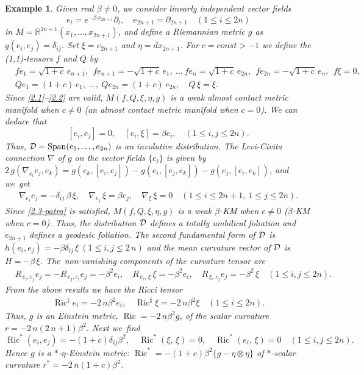 \documentclass[11pt,a4paper,twoside]{article}
\newtheorem{example}{Example}%
\def\Ric{\operatorname{Ric}}
\begin{document}
{\begin{example}\label{Ex-ast-RS}\rm
Given real $\beta\ne0$, we consider linearly independent vector fields
\[
 e_i = e^{-\beta\,x_{2n+1}}\partial_i,\quad e_{2n+1} = \partial_{2n+1}\quad (1\le i\le 2n)
\]
in $M=\mathbb{R}^{2n+1}(x_1,\ldots,x_{2n+1})$, and define a Riemannian metric $g$ as $g(e_i,e_j)=\delta_{ij}$.
Set $\xi=e_{2n+1}$ and $\eta=dx_{2n+1}$. For $c=const>-1$ we define the (1,1)-tensors $f$ and $Q$ by
\begin{align*}
& f e_1 = \sqrt{1+c}\,e_{n+1},\ \
  f e_{n+1} = -\sqrt{1+c}\,e_1,\
   \ldots\
  f e_n =\sqrt{1+c}\,e_{2n},\ \
  f e_{2n} = -\sqrt{1+c}\,e_n,\ \
  f \xi =    0, \\
& Q e_1 = (1+c)\,e_1,\
  \ldots, \
  Q e_{2n} = (1+c)\,e_{2n},\quad
  Q\,\xi = \xi.
\end{align*}
Since \eqref{2.1}--\eqref{2.2} are valid, $M(f,Q,\xi,\eta,g)$ is a weak almost contact metric manifold when $c\ne0$ (an almost contact metric manifold when $c=0$). We can deduce that
\[
 [e_i,e_j]=0,\quad [e_i, \xi] = \beta e_i,\quad (1\le i,j\le 2n).
\]
Thus, ${\cal D}={\rm Span}(e_1,\ldots,e_{2n})$ is an involutive distribution.
The Levi-Civita connection $\nabla$ of $g$ on the vector fields $\{e_i\}$ is given by
$2\,g(\nabla_{e_i}e_j, e_k)= g(e_k,[e_i,e_j])-g(e_i,[e_j,e_k])-g(e_j,[e_i,e_k])$, and we~get
\begin{align*}
 \nabla_{e_i}e_j = -\delta_{ij}\,\beta\,\xi,\quad
 \nabla_{e_j}\,\xi = \beta e_j,\quad
 \nabla_{\xi}\,\xi = 0\quad (1\le i\le 2n+1,\ 1\le j\le 2n).
\end{align*}
Since \eqref{2.3-patra} is satisfied, $M(f,Q,\xi,\eta,g)$ is a weak $\beta$-KM when $c\ne0$ ($\beta$-KM when $c=0$).
Thus, the distribution ${\cal D}$ defines a totally umbilical foliation and $e_{2n+1}$ defines a geodesic foliation.
The second fundamental form of ${\cal D}$ is $h(e_i,e_j)=-\beta\delta_{ij}\,\xi\ (1\le i,j\le 2\,n)$
and the mean curvature vector of ${\cal D}$ is $H=-\beta\,\xi$.
The~non-vanishing components of the curvature tensor are
\begin{align*}
 & R_{\,e_i,e_j}e_j = - R_{\,e_j,e_i}e_j = - \beta^2 e_i,\quad
 R_{\,e_i,\,\xi}\,\xi = -\beta^2 e_i,\quad R_{\,\xi,\,e_j}e_j = -\beta^2\,\xi\quad (1\le i,j\le 2n).
\end{align*}
From the above results we have the Ricci tensor
\begin{align*}
 \Ric^\sharp e_i = -2\,n\beta^2 e_i,\quad \Ric^\sharp \xi = -2\,n\beta^2 \xi\quad (1\le i\le 2n).
\end{align*}
Thus, $g$ is an Einstein metric, $\Ric = -2\,n\beta^2 g$, of the scalar curvature $r=-2\,n(2\,n+1)\beta^2$.
Next we~find
\[
 \Ric^\ast(e_i,e_j)=-(1+c)\delta_{ij}\beta^2,\quad
 \Ric^\ast(\xi,\,\xi)=0,\quad
 \Ric^\ast(e_i,\,\xi)=0\quad (1\le i,j\le 2n).
\]
Hence $g$ is a $\ast$-$\eta$-Einstein metric: $\Ric^\ast=-(1+c)\beta^2\{g-\eta\otimes\eta\}$ of $\ast$-scalar curvature $r^*=-2\,n(1+c)\beta^2$.


\end{example}}
\end{document}
